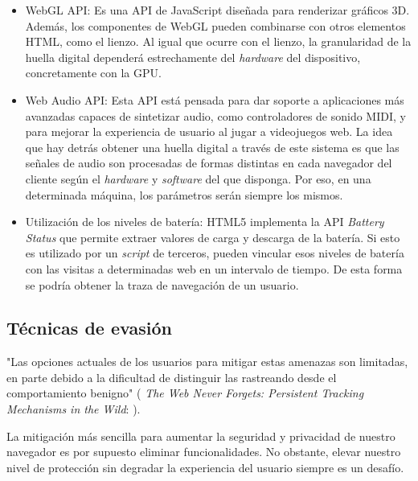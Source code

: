 \begin{itemize}
	\item WebGL API: Es una API de JavaScript diseñada para renderizar gráficos 3D. Además, los componentes de WebGL pueden combinarse con otros elementos HTML, como el lienzo\cite{canvas_paper}. Al igual que ocurre con el lienzo, la granularidad de la huella digital dependerá estrechamente del \textit{hardware} del dispositivo, concretamente con la GPU. \par 
	
	\item Web Audio API\cite{audio_w3c}: Esta API está pensada para dar soporte a aplicaciones más avanzadas capaces de sintetizar audio, como controladores de sonido MIDI, y para mejorar la experiencia de usuario al jugar a videojuegos web. La idea que hay detrás obtener una huella digital a través de este sistema es que las señales de audio son procesadas de formas distintas en cada navegador del cliente según el \textit{hardware} y \textit{software} del que disponga. Por eso, en una determinada máquina, los parámetros serán siempre los mismos. \par 
	
	\item Utilización de los niveles de batería: HTML5 implementa la API \textit{Battery Status} que permite extraer valores de carga y descarga de la batería. Si esto es utilizado por un \textit{script} de terceros, pueden vincular esos niveles de batería con las visitas a determinadas web en un intervalo de tiempo. De esta forma se podría obtener la traza de navegación de un usuario\cite{battery_paper}. \par 
	
\end{itemize}

\subsection{Técnicas de evasión}
"Las opciones actuales de los usuarios para mitigar estas amenazas son limitadas, en parte debido a la dificultad de distinguir las rastreando desde el comportamiento benigno" ( \textit{The Web Never Forgets: Persistent Tracking Mechanisms in the Wild}: \cite{never_forget_paper} ). \par 

La mitigación más sencilla para aumentar la seguridad y privacidad de nuestro navegador es por supuesto eliminar funcionalidades. No obstante, elevar nuestro nivel de protección sin degradar la experiencia del usuario siempre es un desafío. \par 


